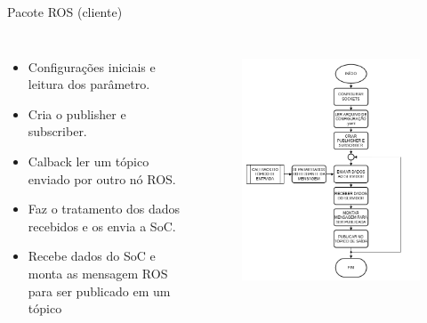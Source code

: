 \documentclass[10pt]{beamer}
\begin{document}
\begin{frame}{Pacote ROS (cliente)}
	\begin{alertblock}{}
		\begin{columns}
			\begin{itemize}
				\setlength\itemsep{0.6em}
				\item Configurações iniciais e leitura dos parâmetro.
				\item Cria o publisher e subscriber.
				\item Calback ler um tópico enviado por outro nó ROS.
				\item Faz o tratamento dos dados recebidos e os envia a SoC.
				\item Recebe dados do SoC e monta as mensagem ROS para ser publicado em um tópico
			\end{itemize}
			\begin{figure}[h]
				\begin{center}
					\includegraphics[scale=0.24]{imagens/fluxogramaCliente.png}\\
				\end{center}
				\label{fig:cliente}
			\end{figure}
		\end{columns}
	\end{alertblock}
\end{frame}
\end{document}
